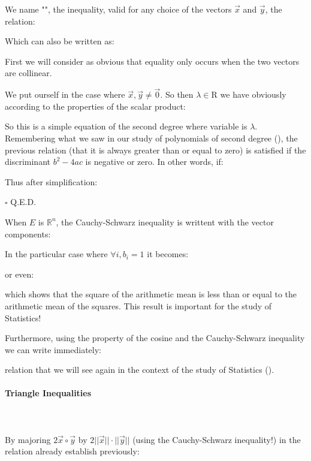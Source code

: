 	\begin{theorem}
	We name "\label{cauchy-schwarz inequality}", the inequality, valid for any choice of the vectors $\vec{x}$ and $\vec{y}$, the relation:
	
	Which can also be written as:
	
	\end{theorem}
	First we will consider as obvious that equality only occurs when the two vectors are collinear.	
	\begin{dem}
	We put ourself in the case where $\vec{x},\vec{y}\neq\vec{0}$. So then $\lambda\in\mathrm{R}$ we have obviously according to the properties of the scalar product:
	
	So this is a simple equation of the second degree where variable is $\lambda$. Remembering what we saw in our study of polynomials of second degree (), the previous relation (that it is always greater than or equal to zero) is satisfied if the discriminant $b^2-4ac$ is negative or zero. In other words, if:
	
	Thus after simplification:
	
	\begin{flushright}
		$\square$  Q.E.D.
	\end{flushright}
	\end{dem}
	When $E$ is $\mathbb{R}^n$, the Cauchy-Schwarz inequality is writtent with the vector components:
	
	In the particular case where $\forall i,b_i=1$ it becomes:
	
	or even:
	
	which shows that the square of the arithmetic mean is less than or equal to the arithmetic mean of the squares. This result is important for the study of Statistics!
	
	Furthermore, using the property of the cosine and the Cauchy-Schwarz inequality we can write immediately:
	
	relation that we will see again in the context of the study of Statistics ().
	
	\paragraph{Triangle Inequalities}\mbox{}\\\\
	By majoring $2\vec{x}\circ\vec{y}$ by $2||\vec{x}||\cdot||\vec{y}||$ (using the Cauchy-Schwarz inequality!) in the relation already establish previously:
	
